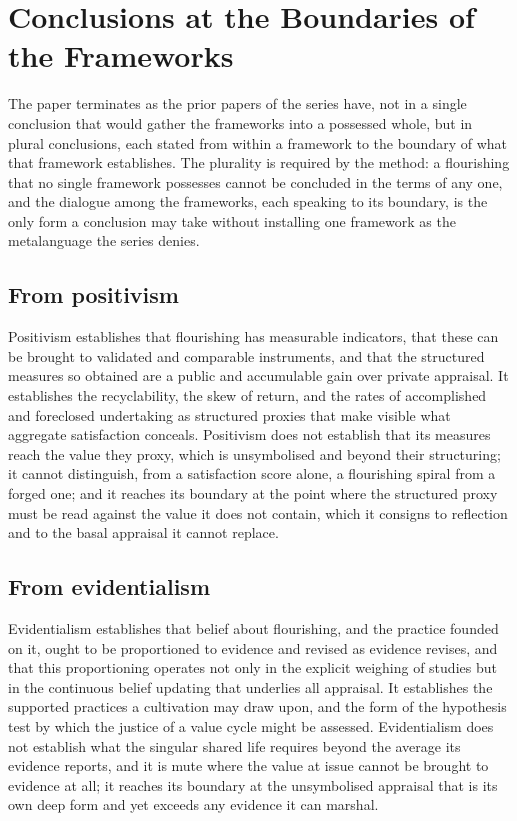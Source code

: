 \section{Conclusions at the Boundaries of the Frameworks}
\label{p11:sec:conclusions}

\noindent
The paper terminates as the prior papers of the series have, not in a single conclusion that would gather the frameworks into a possessed whole, but in plural conclusions, each stated from within a framework to the boundary of what that framework establishes. The plurality is required by the method: a flourishing that no single framework possesses cannot be concluded in the terms of any one, and the dialogue among the frameworks, each speaking to its boundary, is the only form a conclusion may take without installing one framework as the metalanguage the series denies.

\subsection{From positivism}
\label{p11:sec:concl-positivism}

Positivism establishes that flourishing has measurable indicators, that these can be brought to validated and comparable instruments, and that the structured measures so obtained are a public and accumulable gain over private appraisal. It establishes the recyclability, the skew of return, and the rates of accomplished and foreclosed undertaking as structured proxies that make visible what aggregate satisfaction conceals. Positivism does not establish that its measures reach the value they proxy, which is unsymbolised and beyond their structuring; it cannot distinguish, from a satisfaction score alone, a flourishing spiral from a forged one; and it reaches its boundary at the point where the structured proxy must be read against the value it does not contain, which it consigns to reflection and to the basal appraisal it cannot replace.

\subsection{From evidentialism}
\label{p11:sec:concl-evidentialism}

Evidentialism establishes that belief about flourishing, and the practice founded on it, ought to be proportioned to evidence and revised as evidence revises, and that this proportioning operates not only in the explicit weighing of studies but in the continuous belief updating that underlies all appraisal. It establishes the supported practices a cultivation may draw upon, and the form of the hypothesis test by which the justice of a value cycle might be assessed. Evidentialism does not establish what the singular shared life requires beyond the average its evidence reports, and it is mute where the value at issue cannot be brought to evidence at all; it reaches its boundary at the unsymbolised appraisal that is its own deep form and yet exceeds any evidence it can marshal.

